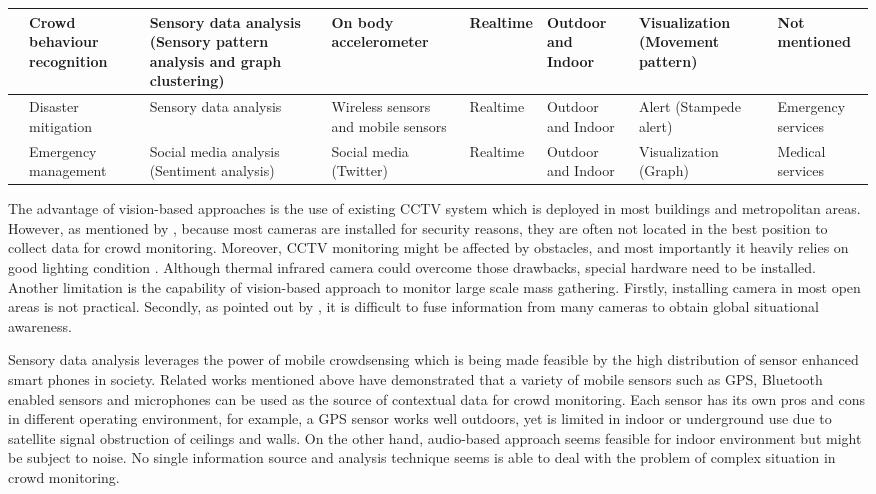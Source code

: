 \begin{center}
\begin{longtable}{|p{1.8cm}|p{2cm}|p{2cm}|p{1.8cm}|p{1.3cm}|p{1.3cm}|p{2cm}|p{1.3cm}|}
		\citet{Roggen2011} & Crowd behaviour recognition & Sensory data analysis (Sensory pattern analysis and graph clustering) & On body accelerometer & Realtime & Outdoor and Indoor & Visualization (Movement pattern) & Not mentioned \\
		\hline
		\citet{Ramesh2014} & Disaster mitigation & Sensory data analysis & Wireless sensors and mobile sensors & Realtime & Outdoor and Indoor & Alert (Stampede alert) & Emergency services \\
		\hline
		\citet{DelirHaghighi2013} & Emergency management & Social media analysis (Sentiment analysis) & Social media (Twitter) & Realtime & Outdoor and Indoor & Visualization (Graph) & Medical services \\
		\hline
	\end{longtable}
\end{center}

The advantage of vision-based approaches is the use of existing CCTV system which is deployed in most buildings and metropolitan areas. However, as mentioned by \citet{Davies1995}, because most cameras are installed for security reasons, they are often not located in the best position to collect data for crowd monitoring. Moreover, CCTV monitoring might be affected by obstacles, and most importantly it heavily relies on good lighting condition \citep{Wirz2012}. Although thermal infrared camera could overcome those drawbacks, special hardware need to be installed. Another limitation is the capability of vision-based approach to monitor large scale mass gathering. Firstly, installing camera in most open areas is not practical. Secondly, as pointed out by \citet{Wirz2012}, it is difficult to fuse information from many cameras to obtain global situational awareness.

Sensory data analysis leverages the power of mobile crowdsensing which is being made feasible by the high distribution of sensor enhanced smart phones in society. Related works mentioned above have demonstrated that a variety of mobile sensors such as GPS, Bluetooth enabled sensors and microphones can be used as the source of contextual data for crowd monitoring. Each sensor has its own pros and cons in different operating environment, for example, a GPS sensor works well outdoors, yet is limited in indoor or underground use due to satellite signal obstruction of ceilings and walls. On the other hand, audio-based approach seems feasible for indoor environment but might be subject to noise. No single information source and analysis technique seems is able to deal with the problem of complex situation in crowd monitoring.

